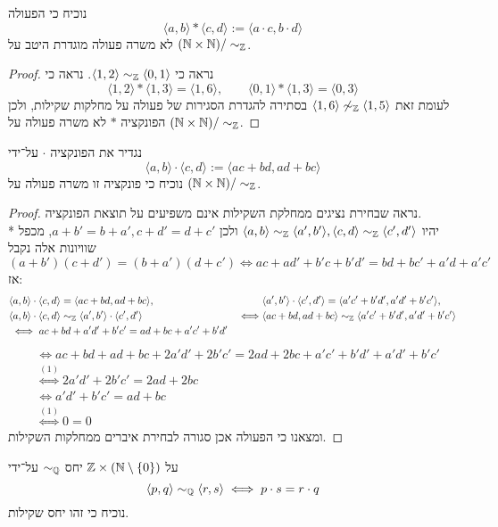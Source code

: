 \Subquestion{}
נוכיח כי הפעולה
\[
	\langle a, b \rangle * \langle c, d \rangle := \langle a \cdot c, b \cdot d \rangle
\]
לא משרה פעולה מוגדרת היטב על $(\mathbb{N} \times \mathbb{N}) / \sim_{\mathbb{Z}}$.
\begin{proof}
	נראה כי $\langle 1, 2 \rangle \sim_{\mathbb{Z}} \langle 0, 1 \rangle$. נראה כי
	\[
		\langle 1, 2\rangle * \langle 1, 3 \rangle = \langle 1, 6\rangle, 
		\qquad
		\langle 0, 1 \rangle * \langle 1, 3 \rangle = \langle 0, 3 \rangle
	\]
	לעומת זאת $\langle 1, 6 \rangle \not\sim_{\mathbb{Z}} \langle 1, 5 \rangle$ בסתירה להגדרת הסגירות של פעולה על מחלקות שקילות, ולכן הפונקציה $*$ לא משרה פעולה על $(\mathbb{N} \times \mathbb{N}) / \sim_{\mathbb{Z}}$.
\end{proof}

\Subquestion{}
נגדיר את הפונקציה $\cdot$ על־ידי
\[
	\langle a, b \rangle \cdot \langle c, d \rangle := \langle ac + bd, ad + bc \rangle
\]
נוכיח כי פונקציה זו משרה פעולה על $(\mathbb{N} \times \mathbb{N}) / \sim_{\mathbb{Z}}$.
\begin{proof}
	נראה שבחירת נציגים ממחלקת השקילות אינם משפיעים על תוצאת הפונקציה. \\*
	יהיו $\langle a, b \rangle \sim_{\mathbb{Z}} \langle a', b' \rangle, \langle c, d \rangle \sim_{\mathbb{Z}} \langle c', d' \rangle$ 
	ולכן $a + b' = b + a', c + d' = d + c'$, מכפל שוויונות אלה נקבל
	\[
		(a + b')(c + d') = (b + a')(d + c')
		\iff ac + ad' + b'c + b'd' = bd + bc' + a'd + a'c' \tag{1}
	\]
	אז:
	\begin{align*}
		& \langle a, b \rangle \cdot \langle c, d \rangle = \langle ac + bd, ad + bc \rangle,
		& & \langle a', b' \rangle \cdot \langle c', d' \rangle = \langle a'c' + b'd', a'd' + b'c' \rangle, \\
		& \langle a, b \rangle \cdot \langle c, d \rangle \sim_{\mathbb{Z}} \langle a', b' \rangle \cdot \langle c', d' \rangle
		& \iff  & \langle ac + bd, ad + bc \rangle \sim_{\mathbb{Z}} \langle a'c' + b'd', a'd' + b'c' \rangle \\
		& \iff ac + bd + a'd' + b'c' = ad + bc + a'c' + b'd'
	\end{align*}
	\begin{align*}
		& \iff ac + bd + ad + bc + 2a'd' + 2b'c' = 2ad + 2bc + a'c' + b'd' + a'd' + b'c' \\
		& \overset{(1)}{\iff} 2a'd' + 2b'c' = 2ad + 2bc \\
		& \iff a'd' + b'c' = ad + bc \\
		& \overset{(1)}{\iff} 0 = 0
	\end{align*}
	ומצאנו כי הפעולה אכן סגורה לבחירת איברים ממחלקות השקילות.
\end{proof}

\Question{}
\Subquestion{}
על $\mathbb{Z} \times (\mathbb{N} \setminus \{0\})$ יחס $\sim_{\mathbb{Q}}$ על־ידי
\[
	\langle p, q \rangle \sim_{\mathbb{Q}} \langle r, s \rangle \iff p \cdot s = r \cdot q
\]
נוכיח כי זהו יחס שקילות.


